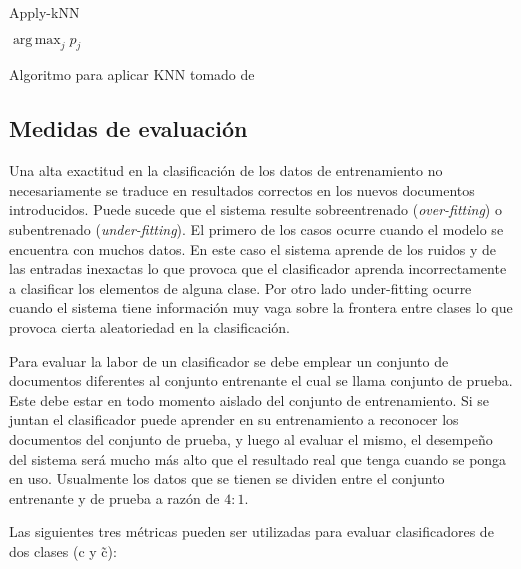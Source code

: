 \documentclass{llncs}
\DeclareMathOperator*{\argmax}{arg\,max}
\begin{document}
		\begin{algorithm}{}
			\caption{Apply-kNN}
			\begin{algorithmic}[1]
				
				\EndFor
				\State \textbf{\Return} $\argmax_j p_j$
			\end{algorithmic}
				
			\smallskip
			\tiny{Algoritmo para aplicar KNN tomado de \cite[Figura 14.7]{B1}}
		\end{algorithm}
		
		
		\subsection{Medidas de evaluaci\'on}
			
			Una alta exactitud en la clasificaci\'on de los datos de entrenamiento no necesariamente se traduce en resultados correctos en los nuevos documentos introducidos. Puede sucede que el sistema resulte sobreentrenado (\emph{over-fitting}) o subentrenado (\emph{under-fitting}). El primero de los casos ocurre cuando el modelo se encuentra con muchos datos. En este caso el sistema aprende de los ruidos y de las entradas inexactas lo que provoca que el clasificador aprenda incorrectamente a clasificar los elementos de alguna clase. Por otro lado under-fitting ocurre cuando el sistema tiene informaci\'on muy vaga sobre la frontera entre clases lo que provoca cierta aleatoriedad en la clasificaci\'on.
			
			Para evaluar la labor de un clasificador se debe emplear un conjunto de documentos diferentes al conjunto entrenante el cual se llama conjunto de prueba. Este debe estar en todo momento aislado del conjunto de entrenamiento. Si se juntan el clasificador puede aprender en su entrenamiento a reconocer los documentos del conjunto de prueba, y luego  al evaluar el mismo, el desempe\~no del sistema ser\'a mucho m\'as alto que el resultado real que tenga cuando se ponga en uso. Usualmente los datos que se tienen se dividen entre el conjunto entrenante y de prueba a raz\'on de $4:1$.
			
			Las siguientes tres m\'etricas pueden ser utilizadas para evaluar clasificadores de dos clases (c y \~c):	
					
\end{document}
